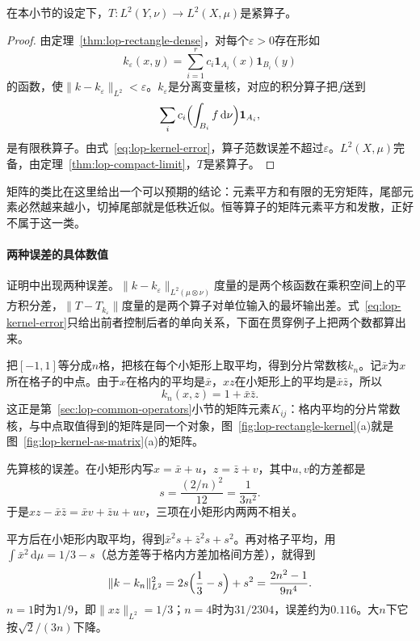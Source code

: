 \begin{theorem}[平方可积核给出紧算子]
\label{thm:lop-hs-compact}
在本小节的设定下，$T:L^2(Y,\nu)\to L^2(X,\mu)$是紧算子。
\end{theorem}

\begin{proof}
由定理~\ref{thm:lop-rectangle-dense}，对每个$\varepsilon>0$存在形如
\[
 k_\varepsilon(x,y)=\sum_{i=1}^rc_i\mathbf 1_{A_i}(x)\mathbf 1_{B_i}(y)
\]
的函数，使$\lVert k-k_\varepsilon\rVert_{L^2}<\varepsilon$。$k_\varepsilon$是分离变量核，对应的积分算子把$f$送到
\[
 \sum_ic_i\Bigl(\int_{B_i}f\,\mathrm d\nu\Bigr)\mathbf 1_{A_i},
\]
是有限秩算子。由式~\eqref{eq:lop-kernel-error}，算子范数误差不超过$\varepsilon$。$L^2(X,\mu)$完备，由定理~\ref{thm:lop-compact-limit}，$T$是紧算子。
\end{proof}

矩阵的类比在这里给出一个可以预期的结论：元素平方和有限的无穷矩阵，尾部元素必然越来越小，切掉尾部就是低秩近似。恒等算子的矩阵元素平方和发散，正好不属于这一类。

\paragraph{两种误差的具体数值}
证明中出现两种误差。$\lVert k-k_\varepsilon\rVert_{L^2(\mu\otimes\nu)}$度量的是两个核函数在乘积空间上的平方积分差，$\lVert T-T_{k_\varepsilon}\rVert$度量的是两个算子对单位输入的最坏输出差。式~\eqref{eq:lop-kernel-error}只给出前者控制后者的单向关系，下面在贯穿例子上把两个数都算出来。

把$[-1,1]$等分成$n$格，把核在每个小矩形上取平均，得到分片常数核$k_n$。记$\bar x$为$x$所在格子的中点。由于$x$在格内的平均是$\bar x$，$xz$在小矩形上的平均是$\bar x\bar z$，所以
\[
 k_n(x,z)=1+\bar x\bar z.
\]
这正是第~\ref{sec:lop-common-operators}小节的矩阵元素$K_{ij}$：格内平均的分片常数核，与中点取值得到的矩阵是同一个对象，图~\ref{fig:lop-rectangle-kernel}(a)就是图~\ref{fig:lop-kernel-as-matrix}(a)的矩阵。

先算核的误差。在小矩形内写$x=\bar x+u$，$z=\bar z+v$，其中$u,v$的方差都是
\[
 s=\frac{(2/n)^2}{12}=\frac1{3n^2}.
\]
于是$xz-\bar x\bar z=\bar xv+\bar zu+uv$，三项在小矩形内两两不相关。

平方后在小矩形内取平均，得到$\bar x^2s+\bar z^2s+s^2$。再对格子平均，用$\int\bar x^2\,\mathrm d\mu=1/3-s$（总方差等于格内方差加格间方差），就得到
\begin{equation}
 \lVert k-k_n\rVert_{L^2}^2=2s\Bigl(\frac13-s\Bigr)+s^2=\frac{2n^2-1}{9n^4}.
 \label{eq:lop-kernel-grid-error}
\end{equation}
$n=1$时为$1/9$，即$\lVert xz\rVert_{L^2}=1/3$；$n=4$时为$31/2304$，误差约为$0.116$。大$n$下它按$\sqrt2/(3n)$下降。

